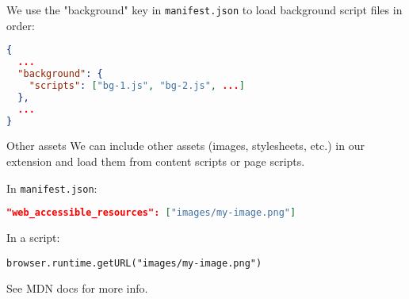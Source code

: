 \documentclass[../index.tex]{subfiles}
\begin{document}
\begin{frame}[fragile]{\currenttitle}
  We use the "background" key in \texttt{manifest.json} to load background
  script files in order:
  \begin{lstlisting}[language=json]
{
  ...
  "background": {
    "scripts": ["bg-1.js", "bg-2.js", ...]
  },
  ...
}
  \end{lstlisting}
\end{frame}

\renewcommand{\currenttitle}{Other assets}
\begin{frame}[fragile]{\currenttitle}
  We can include other assets (images, stylesheets, etc.) in our extension and
  load them from content scripts or page scripts.

  In \texttt{manifest.json}:
  \begin{lstlisting}[language=json]
    "web_accessible_resources": ["images/my-image.png"]
  \end{lstlisting}

  In a script:
  \begin{lstlisting}[language=ES6]
    browser.runtime.getURL("images/my-image.png")
  \end{lstlisting}

  See MDN docs\footnotemark{} for more info.
  
\end{frame}

\end{document}
